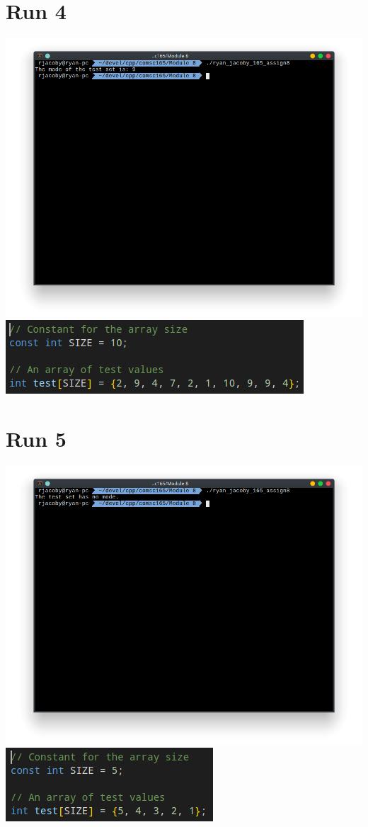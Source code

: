 \documentclass[letterpaper, 11pt]{article}
\begin{document}
\section*{Run 4}
\includegraphics[scale=0.5]{run4.png} \\
\includegraphics[scale=0.5]{run4_2.png}

\section*{Run 5}
\includegraphics[scale=0.5]{run5.png} \\
\includegraphics[scale=0.5]{run5_2.png}
\end{document}
